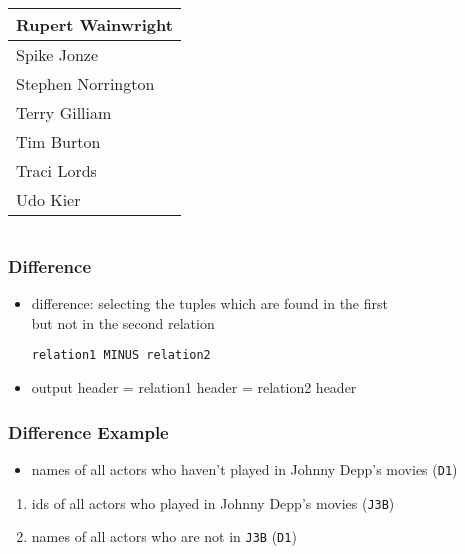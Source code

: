 \documentclass[dvipsnames]{beamer}
\theoremstyle{plain}
\begin{document}
\begin{frame}[fragile]
\begin{columns}[b]
    \begin{tiny}
    \begin{table}
      \begin{tabular}{|l|}\hline
Rupert Wainwright    \\\hline
Spike Jonze          \\\hline
Stephen Norrington   \\\hline
Terry Gilliam        \\\hline
Tim Burton           \\\hline
Traci Lords          \\\hline
Udo Kier             \\\hline
      \end{tabular}
    \end{table}
    \end{tiny}
  \end{columns}
\end{frame}

\begin{frame}[fragile]
  \frametitle{Difference}

  \begin{itemize}
    \item \alert{difference}: selecting the tuples which are found in the first\\
      but not in the second relation
    \begin{lstlisting}
relation1 MINUS relation2
    \end{lstlisting}

    \medskip
    \item output header = relation1 header = relation2 header
  \end{itemize}
\end{frame}

\begin{frame}
  \frametitle{Difference Example}

  \begin{itemize}
    \item names of all actors who haven't played in Johnny Depp's movies
      (\texttt{D1})
  \end{itemize}

  \pause
  \begin{enumerate}
    \item ids of all actors who played in Johnny Depp's movies (\texttt{J3B})
    \item names of all actors who are not in \texttt{J3B} (\texttt{D1})
  \end{enumerate}
\end{frame}
\end{document}
